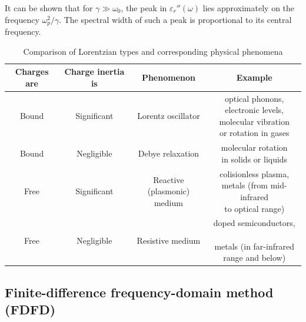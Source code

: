 It can be shown that for $\gamma \gg \omega_0$, the peak in $\varepsilon_r''(\omega)$ lies approximately on the frequency $\omega_p^{2}/\gamma$. The spectral width of such a peak is proportional to its central frequency. 

\begin{table}[ht]   \caption{Comparison of Lorentzian types and corresponding physical phenomena}  \label{tb_lorentzians} \centering 
\begin{tabular}{cc|cc}
 \toprule
\textbf{Charges are}	& \textbf{Charge inertia is}				& \textbf{Phenomenon}				& \textbf{Example}		 \\
 \hline
Bound		& Significant				& Lorentz oscillator					& \shortstack{optical phonons, \\electronic levels,\\ molecular vibration \\or rotation in gases}	\\
 \hline
Bound		& Negligible				& Debye relaxation						& \shortstack{molecular rotation \\in solids or liquids} \\
 \hline
Free	    & Significant				& \shortstack{Reactive\\(plasmonic) medium}			& \shortstack{colisionless plasma, \\metals (from mid-infrared\\to optical range)} \\
 \hline
Free	    & Negligible				& Resistive medium						& \shortstack{doped semiconductors,\\\newline metals (in far-infrared\\ range and below)} \\
 \bottomrule
 \end{tabular} \end{table}

\subsection{Finite-difference frequency-domain method (FDFD)} %

